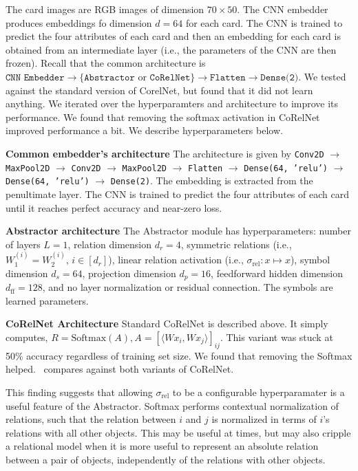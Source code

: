 The card images are RGB images of dimension $70 \times 50$. The CNN embedder produces embeddings fo dimension $d=64$ for each card. The CNN is trained to predict the four attributes of each card and then an embedding for each card is obtained from an intermediate layer (i.e., the parameters of the CNN are then frozen). Recall that the common architecture is $\texttt{CNN Embedder} \to \{\texttt{Abstractor} \text{ or } \texttt{CoRelNet}\} \to \texttt{Flatten} \to \texttt{Dense(2)}$. We tested against the standard version of CorelNet, but found that it did not learn anything. We iterated over the hyperparamters and architecture to improve its performance. We found that removing the softmax activation in CoRelNet improved performance a bit. We describe hyperparameters below.

\textbf{Common embedder's architecture} The architecture is given by \texttt{Conv2D} $\to$ \texttt{MaxPool2D} $\to$ \texttt{Conv2D} $\to$ \texttt{MaxPool2D} $\to$ \texttt{Flatten} $\to$ \texttt{Dense(64, 'relu')} $\to$ \texttt{Dense(64, 'relu')} $\to$ \texttt{Dense(2)}. The embedding is extracted from the penultimate layer. The CNN is trained to predict the four attributes of each card until it reaches perfect accuracy and near-zero loss.

\textbf{Abstractor architecture}
The Abstractor module has hyperparameters: number of layers $L = 1$, relation dimension $d_r = 4$, symmetric relations (i.e., $W_1^{(i)} = W_2^{(i)}$, $i \in [d_r]$), linear relation activation (i.e., $\sigma_{\mathrm{rel}}: x \mapsto x$), symbol dimension $d_s = 64$, projection dimension $d_p = 16$, feedforward hidden dimension $d_{\mathrm{ff}} = 128$, and no layer normalization or residual connection. The symbols are learned parameters.

\textbf{CoRelNet Architecture} Standard CoRelNet is described above. It simply computes, $R = \text{Softmax}(A), A = {\left[\langle W x_i, W x_j\rangle\right]}_{ij}$. This variant was stuck at 50\% accuracy regardless of training set size. We found that removing the Softmax helped.~ compares against both variants of CoRelNet.

This finding suggests that allowing $\sigma_{\mathrm{rel}}$ to be a configurable hyperparamater is a useful feature of the Abstractor. Softmax performs contextual normalization of relations, such that the relation between $i$ and $j$ is normalized in terms of $i$'s relations with all other objects. This may be useful at times, but may also cripple a relational model when it is more useful to represent an absolute relation between a pair of objects, independently of the relations with other objects.


